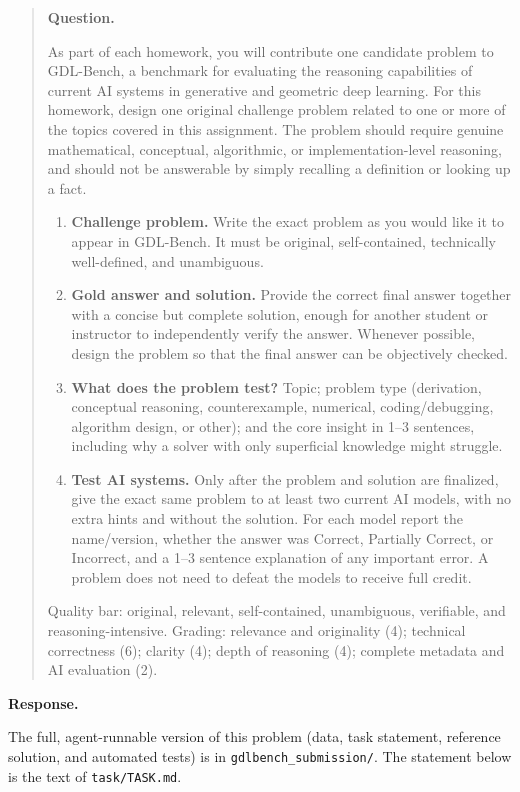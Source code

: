 \documentclass[11pt]{article}
\newenvironment{question}{%
  \par\addvspace{0.8em}%
  \begin{quote}\small
  \noindent\textbf{Question.}\enspace\ignorespaces
}{%
  \end{quote}%
  \par\nopagebreak
  \noindent\textbf{Response.}\par\nopagebreak\smallskip
}
\begin{document}
\begin{question}
As part of each homework, you will contribute one candidate problem to GDL-Bench, a benchmark for evaluating the reasoning capabilities of current AI systems in generative and geometric deep learning. For this homework, design one original challenge problem related to one or more of the topics covered in this assignment. The problem should require genuine mathematical, conceptual, algorithmic, or implementation-level reasoning, and should not be answerable by simply recalling a definition or looking up a fact.
\begin{enumerate}
  \item[(a)] \textbf{Challenge problem.} Write the exact problem as you would like it to appear in GDL-Bench. It must be original, self-contained, technically well-defined, and unambiguous.
  \item[(b)] \textbf{Gold answer and solution.} Provide the correct final answer together with a concise but complete solution, enough for another student or instructor to independently verify the answer. Whenever possible, design the problem so that the final answer can be objectively checked.
  \item[(c)] \textbf{What does the problem test?} Topic; problem type (derivation, conceptual reasoning, counterexample, numerical, coding/debugging, algorithm design, or other); and the core insight in 1--3 sentences, including why a solver with only superficial knowledge might struggle.
  \item[(d)] \textbf{Test AI systems.} Only after the problem and solution are finalized, give the exact same problem to at least two current AI models, with no extra hints and without the solution. For each model report the name/version, whether the answer was Correct, Partially Correct, or Incorrect, and a 1--3 sentence explanation of any important error. A problem does not need to defeat the models to receive full credit.
\end{enumerate}
Quality bar: original, relevant, self-contained, unambiguous, verifiable, and reasoning-intensive. Grading: relevance and originality (4); technical correctness (6); clarity (4); depth of reasoning (4); complete metadata and AI evaluation (2).
\end{question}

The full, agent-runnable version of this problem (data, task statement,
reference solution, and automated tests) is in
\texttt{gdlbench\_submission/}. The statement below is the text of
\texttt{task/TASK.md}.
\end{document}
